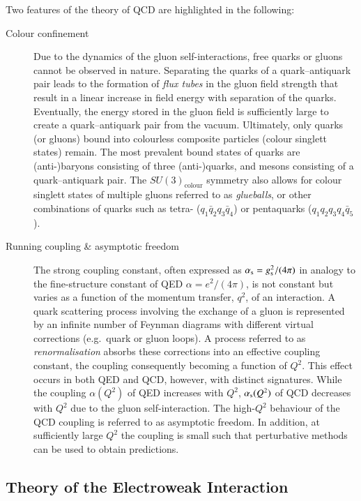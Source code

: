 Two features of the theory of QCD are highlighted in the following:
\begin{description}

\item[Colour confinement] Due to the dynamics of the gluon self-interactions,
  free quarks or gluons cannot be observed in nature. Separating the quarks of a
  quark--antiquark pair leads to the formation of \emph{flux tubes} in the gluon
  field strength that result in a linear increase in field energy with
  separation of the quarks. Eventually, the energy stored in the gluon field is
  sufficiently large to create a quark--antiquark pair from the
  vacuum. Ultimately, only quarks (or gluons) bound into colourless composite
  particles (colour singlett states) remain. The most prevalent bound states of
  quarks are (anti-)baryons consisting of three (anti-)quarks, and mesons
  consisting of a quark--antiquark pair. The $SU(3)_{\text{colour}}$ symmetry
  also allows for colour singlett states of multiple gluons referred to as
  \emph{glueballs}, or other combinations of quarks such as tetra-
  ($q_1 \bar{q}_2 q_3 \bar{q}_4$) or pentaquarks ($q_1 q_2 q_3 q_4 \bar{q}_5$).

\item[Running coupling \& asymptotic freedom] The strong coupling constant,
  often expressed as $\alpha_{\text{s}} = g_{\text{s}}^2 / (4 \pi)$ in analogy to the
  fine-structure constant of QED $\alpha = e^2 / (4 \pi)$, is not constant but
  varies as a function of the momentum transfer, $q^2$, of an interaction. A
  quark scattering process involving the exchange of a gluon is represented by
  an infinite number of Feynman diagrams with different virtual corrections
  (e.g.\ quark or gluon loops). A process referred to as \emph{renormalisation}
  absorbs these corrections into an effective coupling constant, the coupling
  consequently becoming a function of $Q^2$. This effect occurs in both QED and
  QCD, however, with distinct signatures. While the coupling $\alpha(Q^2)$ of
  QED increases with $Q^2$, $\alpha_{\text{s}}(Q^2)$ of QCD decreases with $Q^2$ due to
  the gluon self-interaction. The high-$Q^2$ behaviour of the QCD coupling is
  referred to as asymptotic freedom. In addition, at sufficiently large $Q^2$
  the coupling is small such that perturbative methods can be used to obtain
  predictions.

\end{description}


\subsection{Theory of the Electroweak Interaction}%
\label{seq:theory_ewk}

